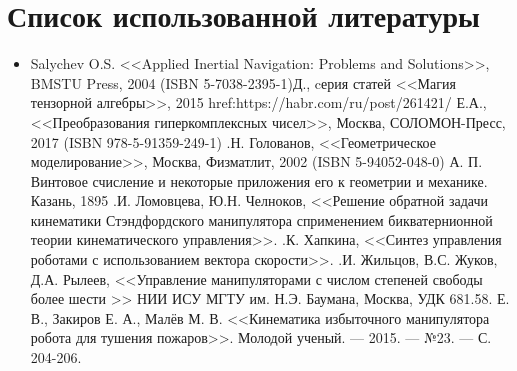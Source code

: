 \section{Список использованной литературы}

\begin{itemize}
\item Salychev O.S. <<Applied Inertial Navigation: Problems and Solutions>>, BMSTU Press, 2004 (ISBN 5-7038-2395-1) Д., cерия статей <<Магия тензорной алгебры>>, 2015 \newline href:https://habr.com/ru/post/261421/
 Е.А., <<Преобразования гиперкомплексных чисел>>, Москва, СОЛОМОН-Пресс, 2017 (ISBN 978-5-91359-249-1)
.Н. Голованов, <<Геометрическое моделирование>>, Москва, Физматлит, 2002 (ISBN 5-94052-048-0)
 А. П. Винтовое счисление и некоторые приложения его к геометрии и механике. Казань, 1895
.И. Ломовцева, Ю.Н. Челноков, <<Решение обратной задачи кинематики Стэндфордского манипулятора сприменением бикватернионной теории кинематического управления>>.
.К. Хапкина, <<Синтез управления роботами с использованием вектора скорости>>.
.И. Жильцов, В.С. Жуков, Д.А. Рылеев, <<Управление манипуляторами  с числом степеней свободы более шести >> НИИ ИСУ МГТУ им. Н.Э. Баумана, Москва, УДК 681.58.
 Е. В., Закиров Е. А., Малёв М. В. <<Кинематика избыточного манипулятора робота для тушения пожаров>>. Молодой ученый. — 2015. — №23. — С. 204-206.
\end{itemize}
